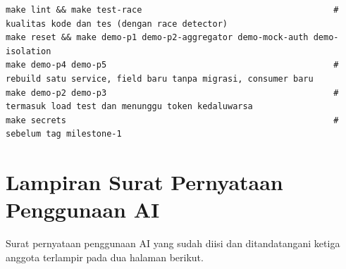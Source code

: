 \begin{lstlisting}
make lint && make test-race                                      # kualitas kode dan tes (dengan race detector)
make reset && make demo-p1 demo-p2-aggregator demo-mock-auth demo-isolation
make demo-p4 demo-p5                                             # rebuild satu service, field baru tanpa migrasi, consumer baru
make demo-p2 demo-p3                                             # termasuk load test dan menunggu token kedaluwarsa
make secrets                                                     # sebelum tag milestone-1
\end{lstlisting}

\chapter{Lampiran Surat Pernyataan Penggunaan AI}

Surat pernyataan penggunaan AI yang sudah diisi dan ditandatangani ketiga anggota terlampir pada dua halaman berikut.


